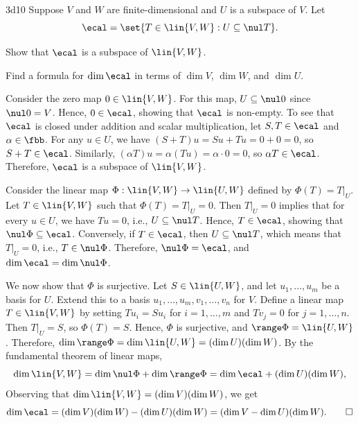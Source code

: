 \begin{exercise}{3d10}
    Suppose $V$ and $W$ are finite-dimensional and $U$ is a subspace of $V$.
	Let
    \[
    	\ecal = \set{T \in \lin{V, W} : U \subseteq \nul T}.
    \]
    \begin{subexercises}
        \item Show that $\ecal$ is a subspace of $\lin{V, W}$.
        \item Find a formula for $\dim \ecal$ in terms of $\dim V$, $\dim W$, and $\dim U$.
    \end{subexercises}
\end{exercise}

\begin{solenum}
    \item Consider the zero map $0 \in \lin{V, W}$.
	For this map, $U \subseteq \nul 0$ since $\nul 0 = V$.
	Hence, $0 \in \ecal$, showing that $\ecal$ is non-empty.
	To see that $\ecal$ is closed under addition and scalar multiplication, let $S, T \in \ecal$ and $\alpha \in \fbb$.
	For any $u \in U$, we have $(S + T)u = Su + Tu = 0 + 0 = 0$, so $S + T \in \ecal$.
	Similarly, $(\alpha T)u = \alpha (Tu) = \alpha \cdot 0 = 0$, so $\alpha T \in \ecal$.
	Therefore, $\ecal$ is a subspace of $\lin{V, W}$.
    \item Consider the linear map $\Phi: \lin{V, W} \to \lin{U, W}$ defined by $\Phi(T) = T|_U$.
	Let $T \in \lin{V, W}$ such that $\Phi(T) = T|_U = 0$.
	Then $T|_U = 0$ implies that for every $u \in U$, we have $Tu = 0$, i.e., $U \subseteq \nul T$.
	Hence, $T \in \ecal$, showing that $\nul \Phi \subseteq \ecal$.
	Conversely, if $T \in \ecal$, then $U \subseteq \nul T$, which means that $T|_U = 0$, i.e., $T \in \nul \Phi$.
	Therefore, $\nul \Phi = \ecal$, and $\dim \ecal = \dim \nul \Phi$.
    
    We now show that $\Phi$ is surjective.
	Let $S \in \lin{U, W}$, and let $u_1, \ldots, u_m $ be a basis for $U$.
	Extend this to a basis $u_1, \ldots, u_m, v_1, \ldots, v_n$ for $V$.
	Define a linear map $T \in \lin{V, W}$ by setting $Tu_i = Su_i$ for $i = 1, \ldots, m$ and $Tv_j = 0$ for $j = 1, \ldots, n$.
	Then $T|_U = S$, so $\Phi(T) = S$.
	Hence, $\Phi$ is surjective, and $\range \Phi = \lin{U, W}$.
	Therefore, $\dim \range \Phi = \dim \lin{U, W} = (\dim U)(\dim W)$.
	By the fundamental theorem of linear maps,
    \[
    	\dim \lin{V, W} = \dim \nul \Phi + \dim \range \Phi = \dim \ecal + (\dim U)(\dim W),
    \]
    Observing that $\dim \lin{V, W} = (\dim V)(\dim W)$, we get
    \[
    	\dim \ecal = (\dim V)(\dim W) - (\dim U)(\dim W) = (\dim V - \dim U)(\dim W). \qedhere
    \]
\end{solenum}

